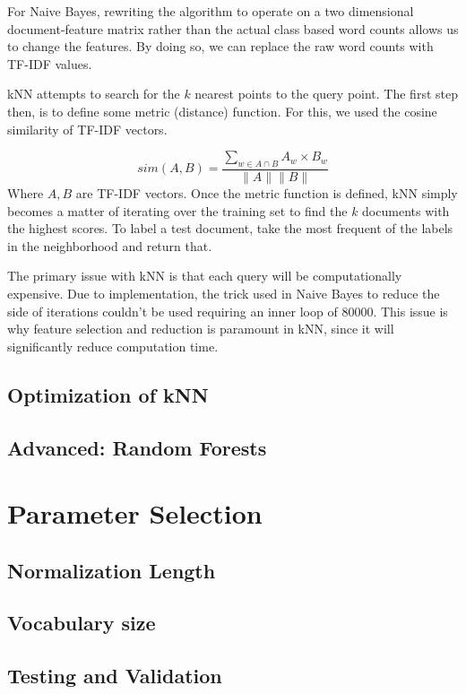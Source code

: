 \documentclass[10pt,twocolumn]{article}
\begin{document}
For Naive Bayes, rewriting the algorithm to operate on a two dimensional document-feature matrix rather than the actual class based word counts allows us to change the features. By doing so, we can replace the raw word counts with TF-IDF values. 

kNN attempts to search for the $k$ nearest points to the query point. The first step then, is to define some metric (distance) function. For this, we used the cosine similarity of TF-IDF vectors.

\[
sim(A,B) = \frac {\sum_{w \in A \cap B} A_w \times B_w} {\| A \| \| B \|}
\]
Where $A,B$ are TF-IDF vectors. Once the metric function is defined, kNN simply becomes a matter of iterating over the training set to find the $k$ documents with the highest scores. To label a test document, take the most frequent of the labels in the neighborhood and return that. 

The primary issue with kNN is that each query will be computationally expensive. Due to implementation, the trick used in Naive Bayes to reduce the side of iterations couldn't be used requiring an inner loop of 80000. This issue is why feature selection and reduction is paramount in kNN, since it will significantly reduce computation time.

\subsection*{Optimization of kNN}

\subsection*{Advanced: Random Forests}

\section*{Parameter Selection}

\subsection*{Normalization Length}

\subsection*{Vocabulary size}

\subsection*{Testing and Validation}
\end{document}
